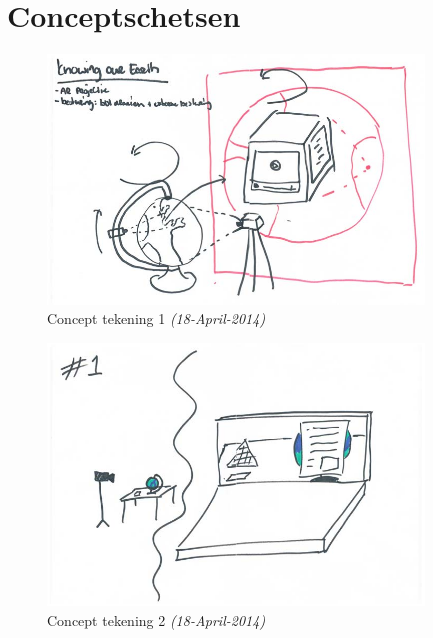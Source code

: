 \section{Conceptschetsen} \label{sec:conceptschetsen}
\begin{figure}[h]
  \includegraphics[width=100mm]{figs/concept1.jpg}
  \caption{Concept tekening 1 \textit{(18-April-2014)}}
  \label{fig:concept1}
\end{figure}
\begin{figure}[h]
  \includegraphics[width=100mm]{figs/concept2.jpg}
  \caption{Concept tekening 2 \textit{(18-April-2014)}}
  \label{fig:concept2}
\end{figure}